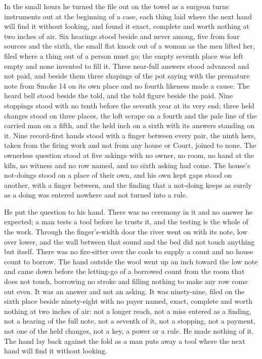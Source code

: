 In the small hours he turned the file out on the towel as a surgeon turns instruments out at the beginning of a case, each thing laid where the next hand will find it without looking, and found it exact, complete and worth nothing at two inches of air. Six hearings stood beside and never among, five from four sources and the sixth, the small flat knock out of a woman as the men lifted her, filed where a thing out of a person must go; the empty seventh place was left empty and none invented to fill it. Three near-full answers stood advanced and not paid, and beside them three shapings of the pot saying with the premature note from Smoke 14 on its own place and no fourth likeness made a cause. The heard bell stood beside the told, and the told figure beside the paid. Nine stoppings stood with no tenth before the seventh year at its very end; three held changes stood on three places, the loft scrape on a fourth and the pale line of the carried man on a fifth, and the held inch on a sixth with its answers standing on it. Nine record-first hands stood with a finger between every pair, the ninth hers, taken from the firing work and not from any house or Court, joined to none. The ownerless question stood at five askings with no owner, no room, no hand at the kiln, no witness and no row named, and no sixth asking had come. The house's not-doings stood on a place of their own, and his own kept gaps stood on another, with a finger between, and the finding that a not-doing keeps as surely as a doing was entered nowhere and not turned into a rule.

He put the question to his hand. There was no ceremony in it and no answer he expected; a man tests a tool before he trusts it, and the testing is the whole of the work. Through the finger's-width door the river went on with its note, low over lower, and the wall between that sound and the bed did not touch anything but itself. There was no fire-sitter over the coals to supply a count and no house count to borrow. The hand outside the wool went up an inch toward the low note and came down before the letting-go of a borrowed count from the room that does not touch, borrowing no stroke and filling nothing to make any row come out even. It was an answer and not an asking. It was ninety-nine, filed on the sixth place beside ninety-eight with no payer named, exact, complete and worth nothing at two inches of air: not a longer reach, not a miss entered as a finding, not a hearing of the full note, not a seventh of it, not a stopping, not a payment, not one of the held changes, not a key, a power or a rule. He made nothing of it. The hand lay back against the fold as a man puts away a tool where the next hand will find it without looking.

